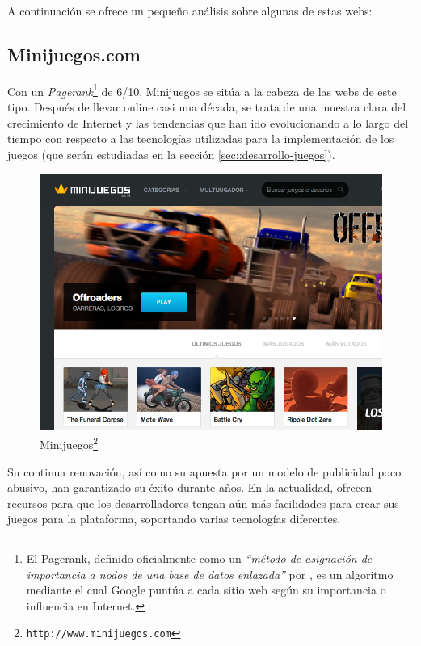 A continuación se ofrece un pequeño análisis sobre algunas de estas webs:

\subsection*{Minijuegos.com}

Con un {\it Pagerank}\footnote{El Pagerank, definido oficialmente como un {\it ``método de asignación de importancia a nodos de una base de datos enlazada''} por \cite{Lawrence2007}, es un algoritmo mediante el cual Google puntúa a cada sitio web según su importancia o influencia en Internet.} de 6/10, Minijuegos \cite{Minijuegos} se sitúa a la cabeza de las webs de este tipo. Después de llevar online casi una década, se trata de una muestra clara del crecimiento de Internet y las tendencias que han ido evolucionando a lo largo del tiempo con respecto a las tecnologías utilizadas para la implementación de los juegos (que serán estudiadas en la sección \ref{sec::desarrollo-juegos}).

\begin{figure}[h]
  \begin{center}
    \includegraphics[width=\textwidth]{images/minijuegos.png}
    \caption{Minijuegos\footnote{{\tt http://www.minijuegos.com}}}
  \end{center}
\end{figure}

Su continua renovación, así como su apuesta por un modelo de publicidad poco abusivo, han garantizado su éxito durante años. En la actualidad, ofrecen recursos para que los desarrolladores tengan aún más facilidades para crear sus juegos para la plataforma, soportando varias tecnologías diferentes.

